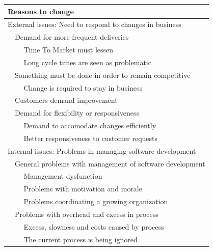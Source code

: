 \documentclass[preprint,authoryear,12pt]{elsarticle}
\begin{document}
\begin{table}
    \begin{tabular}{ p{1.2cm} p{1.2cm} l }
        \toprule
        \multicolumn{3}{l}{Reasons to change}  \\
        \midrule
        
        \multicolumn{3}{l}{External issues: Need to respond to changes in business}  \\
        
        &  \multicolumn{2}{l}{Demand for more frequent deliveries} \\
        &  &  Time To Market must lessen  \\
        &  &  Long cycle times are seen as problematic  \\
        
        &  \multicolumn{2}{l}{Something must be done in order to remain competitive} \\
        &  &  Change is required to stay in business  \\
        
        &  \multicolumn{2}{l}{Customers demand improvement} \\
        
        &  \multicolumn{2}{l}{Demand for flexibility or responsiveness} \\
        &  &  Demand to accomodate changes efficiently  \\
        &  &  Better responsiveness to customer requests  \\
        
        
        \multicolumn{3}{l}{\rule{0pt}{4ex} Internal issues: Problems in managing software development}  \\
        
        &  \multicolumn{2}{l}{General problems with management of software development} \\
        &  &  Management dysfunction  \\
        &  &  Problems with motivation and morale  \\
        &  &  Problems coordinating a growing organization  \\
        
        &  \multicolumn{2}{l}{Problems with overhead and excess in process}  \\
        &  &  Excess, slowness and costs caused by process  \\
        &  &  The current process is being ignored  \\
        

\end{tabular}
\end{table}
\end{document}
